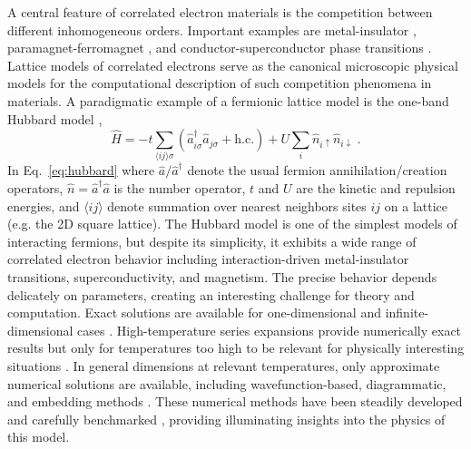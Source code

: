 A central feature of correlated electron materials is the competition between different inhomogeneous orders. Important examples are metal-insulator \cite{imada1998metal}, paramagnet-ferromagnet \cite{spaldin2010magnetic}, and conductor-superconductor phase transitions \cite{orenstein2000advances,dagotto1994correlated}.
Lattice models of correlated electrons serve as the canonical microscopic physical models for the computational description of such competition phenomena in materials.
A paradigmatic example of a fermionic lattice model is the one-band Hubbard model \cite{hubbard1964electron,kanamori1963electron,gutzwiller1963effect,arovas2022hubbard},
\begin{equation}
\label{eq:hubbard}
\hat{H} = -t \sum_{\langle ij \rangle \sigma} ( \hat{a}^\dagger_{i\sigma} \hat{a}_{j\sigma} + \mathrm{h.c.} ) + U \sum_i \hat{n}_{i \uparrow} \hat{n}_{i \downarrow} \;.
\end{equation}
In Eq.~\eqref{eq:hubbard} where $\hat{a}/\hat{a}^\dagger$ denote the usual fermion annihilation/creation operators, $\hat{n} = \hat{a}^\dagger\hat{a}$ is the number operator, $t$ and $U$ are the kinetic and repulsion energies,
and $\langle ij \rangle$ denote summation over nearest neighbors sites $ij$ on a lattice (e.g. the 2D square lattice).
The Hubbard model is one of the simplest models of interacting fermions, but despite its simplicity, it exhibits a wide range of correlated electron behavior including interaction-driven metal-insulator transitions, superconductivity, and magnetism. 
The precise behavior depends delicately on parameters, creating an interesting challenge for theory and computation.
Exact solutions are available for one-dimensional \cite{lieb1968absence} and infinite-dimensional cases \cite{metzner1989correlated}. 
High-temperature series expansions provide numerically exact results but only for temperatures too high to be relevant for physically interesting situations \cite{oitmaa2006series}. 
In general dimensions at relevant temperatures, only approximate numerical solutions are available, including wavefunction-based, diagrammatic, and embedding methods \cite{leblanc2015solutions}.
These numerical methods have been steadily developed and carefully benchmarked \cite{leblanc2015solutions,zheng2017stripe}, providing illuminating insights into the physics of this model.

